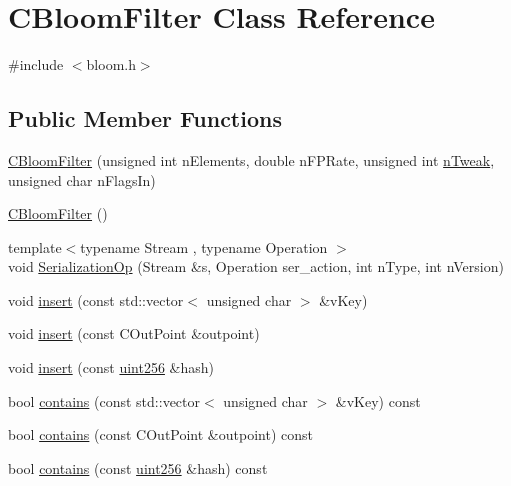 \hypertarget{class_c_bloom_filter}{}\section{C\+Bloom\+Filter Class Reference}
\label{class_c_bloom_filter}


{\ttfamily \#include $<$bloom.\+h$>$}

\subsection*{Public Member Functions}
\begin{DoxyCompactItemize}
\item 
\mbox{\hyperlink{class_c_bloom_filter_a6395cfcb278ed9cf4ae873549c996f83}{C\+Bloom\+Filter}} (unsigned int n\+Elements, double n\+F\+P\+Rate, unsigned int \mbox{\hyperlink{class_c_bloom_filter_af372d9a72fd69dc5e9f31e38ab84bf29}{n\+Tweak}}, unsigned char n\+Flags\+In)
\item 
\mbox{\hyperlink{class_c_bloom_filter_ab38a984b1020bc4afd85c06e90353b28}{C\+Bloom\+Filter}} ()
\item 
{\footnotesize template$<$typename Stream , typename Operation $>$ }\\void \mbox{\hyperlink{class_c_bloom_filter_a2d12234d7febc6197a7349d609733cca}{Serialization\+Op}} (Stream \&s, Operation ser\+\_\+action, int n\+Type, int n\+Version)
\item 
void \mbox{\hyperlink{class_c_bloom_filter_abba52843c7c691ef7deb07d9a645dcc2}{insert}} (const std\+::vector$<$ unsigned char $>$ \&v\+Key)
\item 
void \mbox{\hyperlink{class_c_bloom_filter_aa77e023fc94fd17a0532bf17906e2146}{insert}} (const C\+Out\+Point \&outpoint)
\item 
void \mbox{\hyperlink{class_c_bloom_filter_ac86479ac4ac157a7f0188baaa93202cb}{insert}} (const \mbox{\hyperlink{classuint256}{uint256}} \&hash)
\item 
bool \mbox{\hyperlink{class_c_bloom_filter_afe62e10a4c4cf64e18a2a659d0bcc31b}{contains}} (const std\+::vector$<$ unsigned char $>$ \&v\+Key) const
\item 
bool \mbox{\hyperlink{class_c_bloom_filter_af4557c3253f218eaf13e6d7da53e20e9}{contains}} (const C\+Out\+Point \&outpoint) const
\item 
bool \mbox{\hyperlink{class_c_bloom_filter_a4c26810781cdc0fd34443f32612ac83b}{contains}} (const \mbox{\hyperlink{classuint256}{uint256}} \&hash) const
\item 

\end{DoxyCompactItemize}
